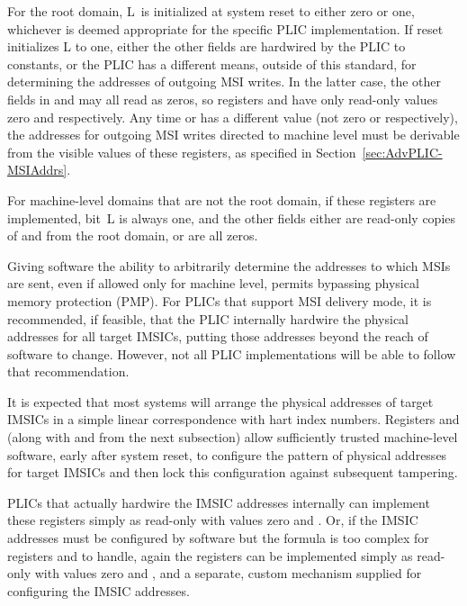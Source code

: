 For the root domain, L~is initialized at
system reset to either zero or one, whichever is
deemed appropriate for the specific PLIC implementation.
If reset initializes L to one, either the other fields are
hardwired by the PLIC to constants, or the PLIC has a different means,
outside of this standard, for determining the addresses of outgoing MSI
writes.
In the latter case, the other fields in  and
 may all read as zeros, so registers  and
 have only read-only values zero and 
respectively.
Any time  or  has a different value
(not zero or  respectively), the addresses for
outgoing MSI writes directed to machine level must be derivable
from the visible values of these registers, as specified in
Section~\ref{sec:AdvPLIC-MSIAddrs}.

For machine-level domains that are not the root domain, if these
registers are implemented, bit~L is always one, and the other
fields either are read-only copies of  and
 from the root domain, or are all zeros.

\begin{commentary}
Giving software the ability to arbitrarily determine the addresses to
which MSIs are sent, even if allowed only for machine level, permits
bypassing physical memory protection (PMP).
For PLICs that support MSI delivery mode, it is recommended, if
feasible, that the PLIC internally hardwire the physical addresses for
all target IMSICs, putting those addresses beyond the reach of software
to change.
However, not all PLIC implementations will be able to follow that
recommendation.

It is expected that most systems will arrange the
physical addresses of target IMSICs in a simple
linear correspondence with hart index numbers.
Registers  and  (along with
 and  from the next subsection) allow
sufficiently trusted machine-level software, early after system reset,
to configure the pattern of physical addresses for target IMSICs and
then lock this configuration against subsequent tampering.

PLICs that actually hardwire the IMSIC addresses internally
can implement these registers simply as read-only with values zero
and .
Or, if the IMSIC addresses must be configured by software but
the formula is too complex for registers  and
 to handle, again the registers can be implemented
simply as read-only with values zero and , and a
separate, custom mechanism supplied for configuring the IMSIC
addresses.
\end{commentary}

